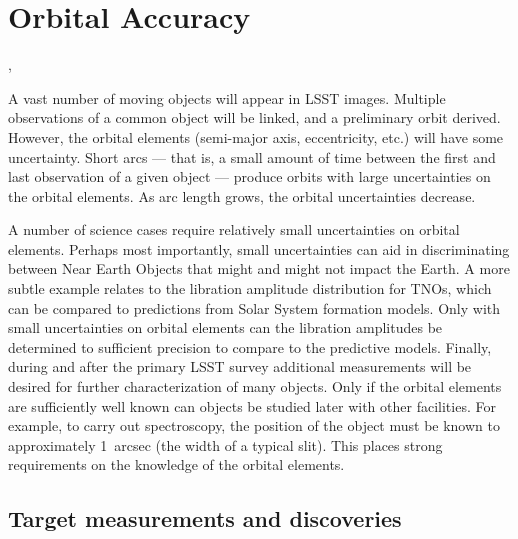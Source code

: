 %
%

\section{Orbital Accuracy}
\def\secname{\chpname:orbits}\label{sec:\secname}

,

A vast number of moving objects will appear in LSST images. Multiple
observations of a common object will be linked, and a preliminary orbit
derived. However, the orbital elements (semi-major axis, eccentricity,
etc.) will have some uncertainty. Short arcs --- that is, a small amount
of time between the first and last observation of a given object ---
produce orbits with large uncertainties on the orbital elements. As arc
length grows, the orbital uncertainties decrease.

A number of science cases require relatively small uncertainties on
orbital elements. Perhaps most importantly, small uncertainties can aid
in discriminating between Near Earth Objects that might and might not
impact the Earth. A more subtle example relates to the libration
amplitude distribution for TNOs, which can be compared to predictions
from Solar System formation models. Only with small uncertainties on
orbital elements can the libration amplitudes be determined to
sufficient precision to compare to the predictive models. Finally,
during and after the primary LSST survey additional measurements will be
desired for further characterization of many objects. Only if the
orbital elements are sufficiently well known can objects be studied later
with other facilities. For example, to carry out spectroscopy, the
position of the object must be known to approximately 1~arcsec (the
width of a typical slit). This places strong requirements on the
knowledge of the orbital elements.



\subsection{Target measurements and discoveries}
\label{sec:\secname:targets}


